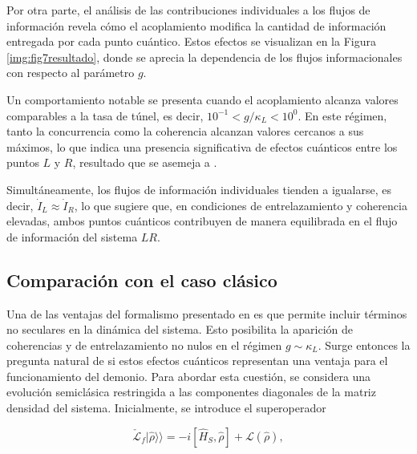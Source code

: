 Por otra parte, el análisis de las contribuciones individuales a los flujos de información revela cómo el acoplamiento modifica la cantidad de información entregada por cada punto cuántico. Estos efectos se visualizan en la Figura \ref{img:fig7resultado}, donde se aprecia la dependencia de los flujos informacionales con respecto al parámetro \( g \).


Un comportamiento notable se presenta cuando el acoplamiento alcanza valores comparables a la tasa de túnel, es decir, \( 10^{-1}< g/\kappa_{L}< 10^{0} \). En este régimen, tanto la concurrencia como la coherencia alcanzan valores cercanos a sus máximos, lo que indica una presencia significativa de efectos cuánticos entre los puntos \( L \) y \( R \), resultado que se asemeja a \cite{prech2023entanglement}. 

Simultáneamente, los flujos de información individuales tienden a igualarse, es decir, \( \dot{I}_{L} \approx \dot{I}_{R} \), lo que sugiere que, en condiciones de entrelazamiento y coherencia elevadas, ambos puntos cuánticos contribuyen de manera equilibrada en el flujo de información del sistema $LR$. 

\label{sec5:demonio1}

\newpage 

\subsection{Comparación con el caso clásico}

Una de las ventajas del formalismo presentado en \cite{potts2021thermodynamically} es que permite incluir términos no seculares en la dinámica del sistema. Esto posibilita la aparición de coherencias y de entrelazamiento no nulos en el régimen \( g \sim \kappa_{L} \). Surge entonces la pregunta natural de si estos efectos cuánticos representan una ventaja para el funcionamiento del demonio. Para abordar esta cuestión, se considera una evolución semiclásica restringida a las componentes diagonales de la matriz densidad del sistema. Inicialmente, se introduce el superoperador

\begin{equation*}
\check{\mathcal{L}}_{f}|\hat{\rho}\rangle\rangle = -i[\hat{H}_{S}, \hat{\rho}] + \mathcal{L}(\hat{\rho}),
\end{equation*}

